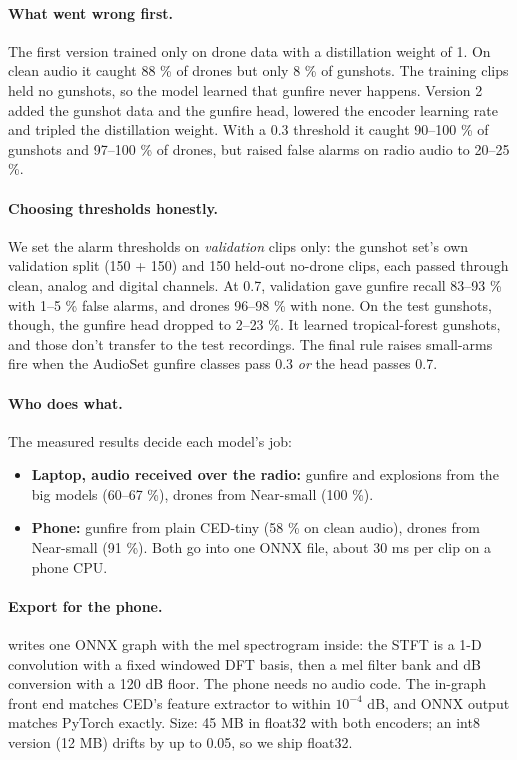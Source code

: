 \paragraph{What went wrong first.} The first version trained only on drone data with a distillation weight of 1. On
clean audio it caught 88 \% of drones but only 8 \% of gunshots. The training clips held no gunshots, so the model
learned that gunfire never happens. Version 2 added the gunshot data and the gunfire head, lowered the encoder learning
rate and tripled the distillation weight. With a 0.3 threshold it caught 90--100 \% of gunshots and 97--100 \% of drones,
but raised false alarms on radio audio to 20--25 \%.

\paragraph{Choosing thresholds honestly.} We set the alarm thresholds on \emph{validation} clips only: the gunshot set's own
validation split (150 + 150) and 150 held-out no-drone clips, each passed through clean, analog and digital channels.
At 0.7, validation gave gunfire recall 83--93 \% with 1--5 \% false alarms, and drones 96--98 \% with none. On the
test gunshots, though, the gunfire head dropped to 2--23 \%. It learned tropical-forest gunshots, and those don't
transfer to the test recordings. The final rule raises small-arms fire when the AudioSet gunfire classes pass 0.3
\emph{or} the head passes 0.7.

\paragraph{Who does what.} The measured results decide each model's job:
\begin{itemize}
  \item \textbf{Laptop, audio received over the radio:} gunfire and explosions from the big models (60--67 \%), drones from
        Near-small (100 \%).
  \item \textbf{Phone:} gunfire from plain CED-tiny (58 \% on clean audio), drones from Near-small (91 \%). Both go into one ONNX
        file, about 30 ms per clip on a phone CPU.
\end{itemize}

\paragraph{Export for the phone.}  writes one ONNX graph with the mel spectrogram inside: the STFT
is a 1-D convolution with a fixed windowed DFT basis, then a mel filter bank and dB conversion with a 120 dB floor. The
phone needs no audio code. The in-graph front end matches CED's feature extractor to within $10^{-4}$ dB, and ONNX
output matches PyTorch exactly. Size: 45 MB in float32 with both encoders; an int8 version (12 MB) drifts by up to 0.05,
so we ship float32.

